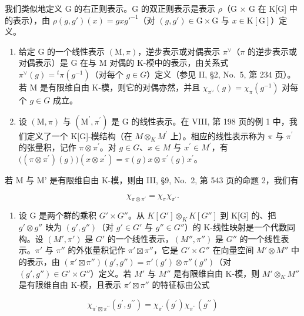 我们类似地定义 G 的右正则表示。G 的双正则表示是表示 \(\rho\)（G × G 在 K{[}G{]} 中的表示），由 \(\rho(g, g')(x) = gxg'^{-1}\)（对 \((g, g') \in \mathrm{G} \times \mathrm{G}\) 与 \(x \in \mathrm{K}[\mathrm{G}]\)）定义。

\begin{enumerate}
\def\labelenumi{\arabic{enumi})}
\setcounter{enumi}{2}
\item
  给定 G 的一个线性表示 \((\mathrm{M},\pi)\)，逆步表示或对偶表示 \(\pi^{\vee}\)（\(\pi\) 的逆步表示或对偶表示）是 G 在与 M 对偶的 K-模中的表示，由关系式 \(\pi^{\vee}(g)={}^{t}\pi(g^{-1})\)（对每个 \(g\in G\)）定义（参见 II, §2, No.~5, 第 234 页）。若 M 是有限维自由 K-模，则它的对偶亦然，并且 \(\chi_{\pi^{\vee}}(g)=\chi_{\pi}(g^{-1})\) 对每个 \(g\in G\) 成立。
\item
  设 \((\mathrm{M},\pi)\) 与 \((\mathrm{M}^{\prime},\pi^{\prime})\) 是 G 的线性表示。在 VIII, 第 198 页的例 1 中，我们定义了一个 K{[}G{]}-模结构（在 \(M\otimes_{K}M^{\prime}\) 上）。相应的线性表示称为 \(\pi\) 与 \(\pi^{\prime}\) 的张量积，记作 \(\pi\otimes\pi^{\prime}\)。对 \(g\in G\)、\(x\in M\) 与 \(x^{\prime}\in M^{\prime}\)，有 \(\big((\pi\otimes\pi^{\prime})(g)\big)(x\otimes x^{\prime})=\pi(g)x\otimes\pi^{\prime}(g)x^{\prime}\)。
\end{enumerate}

若 M 与 M' 是有限维自由 K-模，则由 III, §9, No.~2, 第 543 页的命题 2，我们有

\[
\chi_ {\pi \otimes \pi^ {\prime}} = \chi_ {\pi} \chi_ {\pi^ {\prime}}.\tag{3}
\]

\begin{enumerate}
\def\labelenumi{\arabic{enumi})}
\setcounter{enumi}{4}
\tightlist
\item
  设 G 是两个群的乘积 \(G' \times G''\)。从 \(K[G'] \otimes_{K} K[G'']\) 到 K{[}G{]} 的、把 \(g' \otimes g''\) 映为 \((g', g'')\)（对 \(g' \in G'\) 与 \(g'' \in G''\)）的 K-线性映射是一个代数同构。设 \((M', \pi')\) 是 \(G'\) 的一个线性表示，\((M'', \pi'')\) 是 \(G''\) 的一个线性表示。\(\pi'\) 与 \(\pi''\) 的外张量积记作 \(\pi' \boxtimes \pi''\)，它是 \(G' \times G''\) 在向量空间 \(M' \otimes M''\) 中的表示，由 \((\pi' \boxtimes \pi'')(g', g'') = \pi'(g') \otimes \pi''(g'')\)（对 \((g', g'') \in G' \times G''\)）定义。若 \(M'\) 与 \(M''\) 是有限维自由 K-模，则 \(M' \otimes_{K} M''\) 是有限维自由 K-模，且表示 \(\pi' \boxtimes \pi''\) 的特征标由公式
\end{enumerate}

\[
\chi_ {\pi^ {\prime} \boxtimes \pi^ {\prime \prime}} (g ^ {\prime}, g ^ {\prime \prime}) = \chi_ {\pi^ {\prime}} (g ^ {\prime}) \chi_ {\pi^ {\prime \prime}} (g ^ {\prime \prime})
\]

